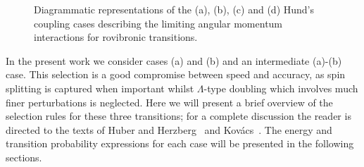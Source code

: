\begin{figure}[ht]
 \center
 \hspace{0.5cm}
 \hspace{0.5cm}
 \hspace{0.5cm}
 \caption{Diagrammatic representations of the (a), (b), (c) and (d) Hund's coupling cases describing the limiting angular momentum interactions for rovibronic transitions.}
 \label{fig:hunds_cases}
\end{figure}


\par

In the present work we consider cases (a) and (b) and an intermediate (a)-(b) case.
This selection is a good compromise between speed and accuracy, as spin splitting is captured when important whilst $\Lambda$-type doubling which involves much finer perturbations is neglected.
Here we will present a brief overview of the selection rules for these three transitions; for a complete discussion the reader is directed to the texts of Huber and Herzberg~\cite{HH_1979} and Kov\'{a}cs~\cite{kovacs69}.
The energy and transition probability expressions for each case will be presented in the following sections.

